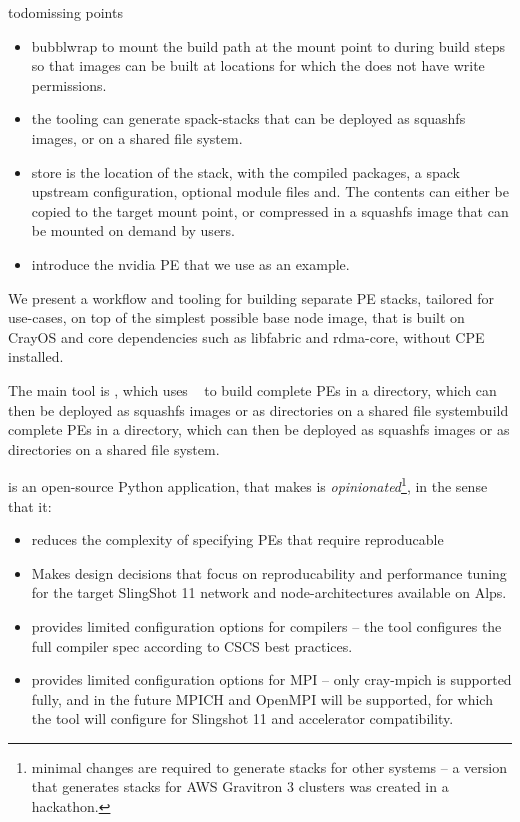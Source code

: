
todo{missing points}
\begin{itemize}
    \item bubblwrap to mount the build path at the mount point to during build steps so that images can be built at locations for which the does not have write permissions.
    \item the tooling can generate spack-stacks that can be deployed as squashfs images, or on a shared file system.
    \item store is the location of the stack, with the compiled packages, a spack upstream configuration, optional module files and. The contents can either be copied to the target mount point, or compressed in a squashfs image that can be mounted on demand by users.
    \item introduce the nvidia PE that we use as an example.
\end{itemize}

We present a workflow and tooling for building separate PE stacks, tailored for use-cases, on top of the simplest possible base node image, that is built on CrayOS and core dependencies such as libfabric and rdma-core, without CPE installed.

The main tool is \href{https://github.com/eth-cscs/stackinator}{\stackinator}, which uses \spack~\cite{gamblin:sc15} to build complete PEs in a directory, which can then be deployed as squashfs images or as directories on a shared file systembuild complete PEs in a directory, which can then be deployed as squashfs images or as directories on a shared file system.

\stackinator is an open-source Python application, that makes is \emph{opinionated}\footnote{minimal changes are required to generate stacks for other systems -- a version that generates stacks for AWS Gravitron 3 clusters was created in a hackathon.}, in the sense that it:
\begin{itemize}
    \item reduces the complexity of specifying PEs that require reproducable 
    \item Makes design decisions that focus on reproducability and performance tuning for the target SlingShot 11 network and node-architectures available on Alps.
    \item provides limited configuration options for compilers -- the tool configures the full compiler spec according to CSCS best practices.
    \item provides limited configuration options for MPI -- only cray-mpich is supported fully, and in the future MPICH and OpenMPI will be supported, for which the tool will configure for Slingshot 11 and accelerator compatibility.
\end{itemize}

